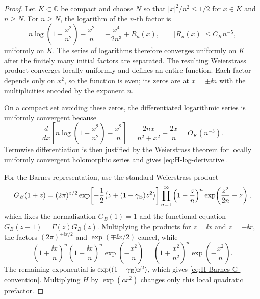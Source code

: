 \begin{proof}
Let \(K\subset\mathbb C\) be compact and choose \(N\) so that
\(|x|^2/n^2\leq 1/2\) for \(x\in K\) and \(n\geq N\).  For \(n\geq N\), the
logarithm of the \(n\)-th factor is
\[
  n\log\!\left(1+\frac{x^2}{n^2}\right)-\frac{x^2}{n}
  =
  -\frac{x^4}{2n^3}+R_n(x),
  \qquad
  |R_n(x)|\leq C_K n^{-5},
\]
uniformly on \(K\).  The series of logarithms therefore converges uniformly on
\(K\) after the finitely many initial factors are separated.  The resulting
Weierstrass product converges locally uniformly and defines an entire
function.  Each factor depends only on \(x^2\), so the function is even; its
zeros are at \(x=\pm \ii n\) with the multiplicities encoded by the exponent
\(n\).

On a compact set avoiding these zeros, the differentiated logarithmic series
is uniformly convergent because
\[
  \frac{d}{dx}
  \left[
    n\log\!\left(1+\frac{x^2}{n^2}\right)-\frac{x^2}{n}
  \right]
  =
  \frac{2nx}{n^2+x^2}-\frac{2x}{n}
  =
  O_K(n^{-3}) .
\]
Termwise differentiation is then justified by the Weierstrass theorem for
locally uniformly convergent holomorphic series and gives
\eqref{eq:H-log-derivative}.

For the Barnes representation, use the standard Weierstrass product
\[
  G_B(1+z)
  =
  (2\pi)^{z/2}
  \exp\!\left[-\frac12\bigl(z+(1+\gamma_{\rm E})z^2\bigr)\right]
  \prod_{n=1}^\infty
  \left(1+\frac zn\right)^n
  \exp\!\left(\frac{z^2}{2n}-z\right),
\]
which fixes the normalization \(G_B(1)=1\) and the functional equation
\(G_B(z+1)=\Gamma(z)G_B(z)\).  Multiplying the products for \(z=\ii x\) and
\(z=-\ii x\), the factors \((2\pi)^{\pm \ii x/2}\) and \(\exp(\mp \ii x/2)\)
cancel, while
\[
  \left(1+\frac{\ii x}{n}\right)^n
  \left(1-\frac{\ii x}{n}\right)^n
  \exp\!\left(-\frac{x^2}{n}\right)
  =
  \left(1+\frac{x^2}{n^2}\right)^n
  \exp\!\left(-\frac{x^2}{n}\right).
\]
The remaining exponential is \(\exp((1+\gamma_{\rm E})x^2)\), which gives
\eqref{eq:H-Barnes-G-convention}.  Multiplying \(H\) by
\(\exp(c x^2)\) changes only this local quadratic prefactor.
\end{proof}

